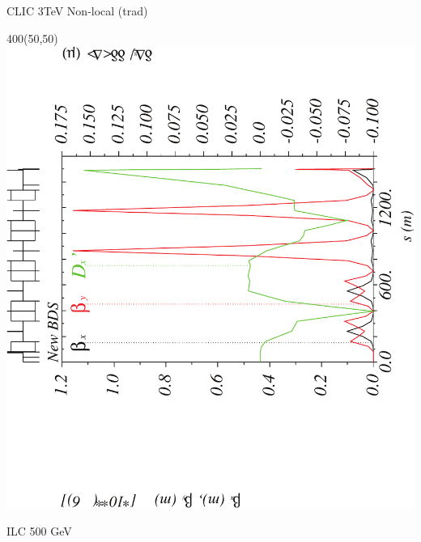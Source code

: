 \documentclass{beamer}
\begin{document}
\begin{frame}{CLIC 3TeV Non-local (trad)}
  \setlength{\TPHorizModule}{1pt}
  \setlength{\TPVertModule}{1pt}
 \begin{textblock}{400}(50,50)
 \includegraphics[scale=0.4,angle=-90]{CLICtrad_ddx-crop.pdf}
 \end{textblock}
\end{frame}
\begin{frame}
 \color{blue}\Large ILC 500 GeV
\end{frame}
\end{document}
